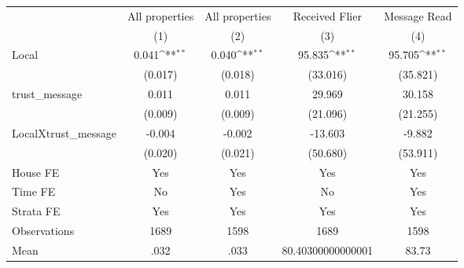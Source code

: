 {
\def\sym#1{\ifmmode^{#1}\else\(^{#1}\)\fi}
\begin{tabular}{l*{4}{c}}
\hline\hline
                &\multicolumn{1}{c}{All properties}&\multicolumn{1}{c}{All properties}&\multicolumn{1}{c}{Received Flier}&\multicolumn{1}{c}{Message Read}\\
                &\multicolumn{1}{c}{(1)}         &\multicolumn{1}{c}{(2)}         &\multicolumn{1}{c}{(3)}         &\multicolumn{1}{c}{(4)}         \\
\hline
Local           &    0.041\sym{**} &    0.040\sym{**} &   95.835\sym{**} &   95.705\sym{**} \\
                &  (0.017)         &  (0.018)         & (33.016)         & (35.821)         \\
trust\_message   &    0.011         &    0.011         &   29.969         &   30.158         \\
                &  (0.009)         &  (0.009)         & (21.096)         & (21.255)         \\
LocalXtrust\_message&   -0.004         &   -0.002         &  -13.603         &   -9.882         \\
                &  (0.020)         &  (0.021)         & (50.680)         & (53.911)         \\
House FE        &      Yes         &      Yes         &      Yes         &      Yes         \\
Time FE         &       No         &      Yes         &       No         &      Yes         \\
Strata FE       &      Yes         &      Yes         &      Yes         &      Yes         \\
\hline
Observations    &     1689         &     1598         &     1689         &     1598         \\
Mean            &     .032         &     .033         &80.40300000000001         &    83.73         \\
\hline\hline
\end{tabular}
}
